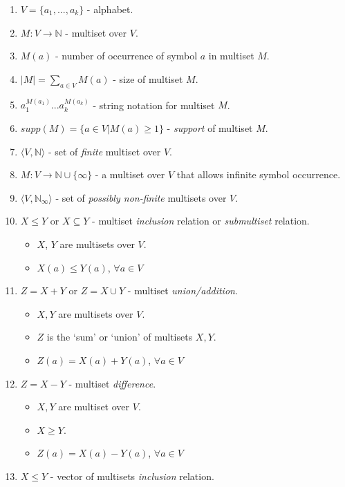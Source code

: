 \documentclass{article}
\begin{document}
\begin{appendices}
\begin{enumerate}
   \item $V=\{a_1,...,a_k\}$ - alphabet.
   \item $M:V \rightarrow \mathbb{N}$ - multiset over $V$.
   \item $M(a)$ - number of occurrence of symbol $a$ in multiset $M$.
   \item $|M| = \sum_{a \in V} M(a)$ - size of multiset $M$.
   \item $a_1^{M(a_1)}...a_k^{M(a_k)}$ - string notation for multiset $M$.
   \item $supp(M) = \{a \in V | M(a) \geq 1\}$ - \emph{support} of multiset $M$.
   \item $\langle V, \mathbb{N}\rangle$ - set of \emph{finite} multiset over $V$.
   \item $M: V \rightarrow \mathbb{N} \cup \{\infty\}$ - a multiset over $V$ that allows infinite
         symbol occurrence.
   \item $\langle V, \mathbb{N}_{\infty} \rangle$ - set of \emph{possibly non-finite} multisets over
         $V$.
   \item $X \leq Y$ or $X \subseteq Y$ - multiset \emph{inclusion} relation or \emph{submultiset} 
         relation.
         \begin{itemize}
         \item $X$, $Y$ are multisets over $V$.
         \item $X(a) \leq Y(a)$, $\forall a \in V$
         \end{itemize}
   \item $Z = X + Y$ or $Z = X \cup Y$ - multiset \emph{union/addition}.
         \begin{itemize}
         \item $X, Y$ are multisets over $V$.
         \item $Z$ is the `sum' or `union' of multisets $X, Y$.
         \item $Z(a) = X(a) + Y(a)$, $\forall a \in V$
         \end{itemize}
   \item $Z = X - Y$ - multiset \emph{difference}.
         \begin{itemize}
         \item $X, Y$ are multiset over $V$.
         \item $X \geq Y$.
         \item $Z(a) = X(a) - Y(a)$, $\forall a \in V$ 
         \end{itemize}
   \item $X \leq Y$ - vector of multisets \emph{inclusion} relation.

\end{enumerate}
\end{appendices}
\end{document}
